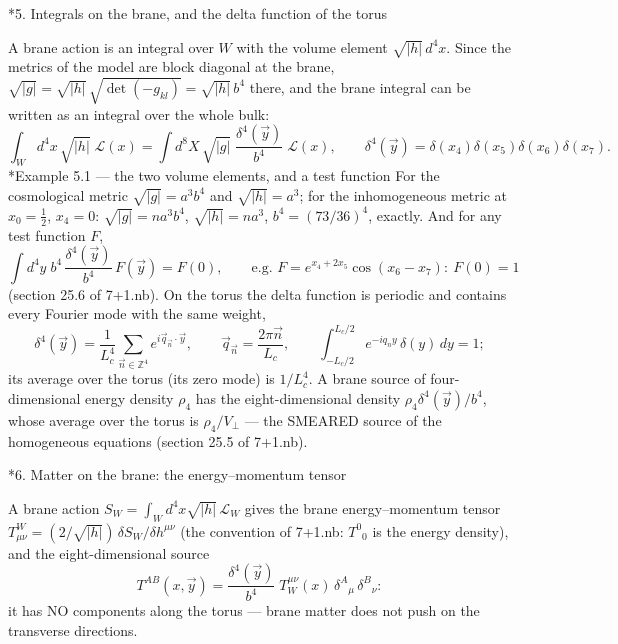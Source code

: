 \documentclass[10pt,a4paper]{article}
\makeatletter
\renewcommand\section{\@startsection{section}{1}{\z@}{-3.5ex \@plus -1ex \@minus -.2ex}{2.3ex \@plus.2ex}{\normalfont\Large\bfseries\raggedright}}
\renewcommand\subsubsection{\@startsection{subsubsection}{3}{\z@}{-3.25ex\@plus -1ex \@minus -.2ex}{1.5ex \@plus .2ex}{\normalfont\normalsize\bfseries\raggedright}}
\makeatother
\begin{document}
\section*{5. Integrals on the brane, and the delta function of the torus}
A brane action is an integral over $W$ with the volume element $\sqrt{|h|}\,d^4x$. Since the metrics of the model are block diagonal at the brane, $\sqrt{|g|}=\sqrt{|h|}\,\sqrt{\det(-g_{kl})}=\sqrt{|h|}\,b^4$ there, and the brane integral can be written as an integral over the whole bulk:
\begin{equation*}
\int_Wd^4x\,\sqrt{|h|}\;\mathcal L(x)=\int d^8X\,\sqrt{|g|}\;\frac{\delta^4(\vec y)}{b^4}\;\mathcal L(x),\qquad \delta^4(\vec y)=\delta(x_4)\delta(x_5)\delta(x_6)\delta(x_7).
\end{equation*}
\subsubsection*{Example 5.1 — the two volume elements, and a test function}
For the cosmological metric $\sqrt{|g|}=a^3b^4$ and $\sqrt{|h|}=a^3$; for the inhomogeneous metric at $x_0=\frac12$, $x_4=0$: $\sqrt{|g|}=na^3b^4$, $\sqrt{|h|}=na^3$, $b^4=(73/36)^4$, exactly. And for any test function $F$,
\begin{equation*}
\int d^4y\;b^4\,\frac{\delta^4(\vec y)}{b^4}\,F(\vec y)=F(0),\qquad\text{e.g. }F=e^{x_4+2x_5}\cos(x_6-x_7):\ F(0)=1
\end{equation*}
(section 25.6 of 7+1.nb). On the torus the delta function is periodic and contains every Fourier mode with the same weight,
\begin{equation*}
\delta^4(\vec y)=\frac1{L_c^4}\sum_{\vec n\in\mathbb Z^4}e^{i\vec q_{\vec n}\cdot\vec y},\qquad \vec q_{\vec n}=\frac{2\pi\vec n}{L_c},\qquad \int_{-L_c/2}^{L_c/2}e^{-iq_ny}\,\delta(y)\,dy=1 ;
\end{equation*}
its average over the torus (its zero mode) is $1/L_c^4$. A brane source of four-dimensional energy density $\rho_4$ has the eight-dimensional density $\rho_4\delta^4(\vec y)/b^4$, whose average over the torus is $\rho_4/V_\perp$ — the SMEARED source of the homogeneous equations (section 25.5 of 7+1.nb).

\section*{6. Matter on the brane: the energy–momentum tensor}
A brane action $S_W=\int_Wd^4x\sqrt{|h|}\,\mathcal L_W$ gives the brane energy–momentum tensor $T^W_{\mu\nu}=(2/\sqrt{|h|})\,\delta S_W/\delta h^{\mu\nu}$ (the convention of 7+1.nb: $T^0{}_0$ is the energy density), and the eight-dimensional source
\begin{equation*}
T^{AB}(x,\vec y)=\frac{\delta^4(\vec y)}{b^4}\;T_W^{\mu\nu}(x)\,\delta^A{}_\mu\,\delta^B{}_\nu :
\end{equation*}
it has NO components along the torus — brane matter does not push on the transverse directions.
\end{document}
